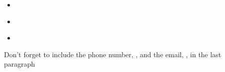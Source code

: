 \documentclass{james-cv}
\begin{document}
\opening{}

\lipsum[1-2]

\begin{itemize}
\item{
  \lipsum[3]
}
\item{
  \lipsum[4]
}
\item{
  \lipsum[5]
}
\end{itemize}

\lipsum[6]

Don't forget to include the phone number, \thephone, and the email, \theemail,
in the last paragraph

\closing{}
\end{document}
